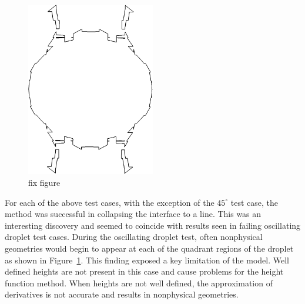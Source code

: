 \begin{figure}
	\centering
	\includegraphics[width=0.5\textwidth]{figs/bad.png}
	\caption{fix figure}
	\label{fig:45s}
\end{figure}
For each of the above test cases, with the exception of the $45^{\circ}$ test case, the method was successful in collapsing the interface to a line. This was an interesting discovery and seemed to coincide with results seen in failing oscillating droplet test cases. During the oscillating droplet test, often nonphysical geometries would begin to appear at each of the quadrant regions of the droplet as shown in Figure~\ref{fig:45s}. This finding exposed a key limitation of the model. Well defined heights are not present in this case and cause problems for the height function method. When heights are not well defined, the approximation of derivatives is not accurate and results in nonphysical geometries.  

